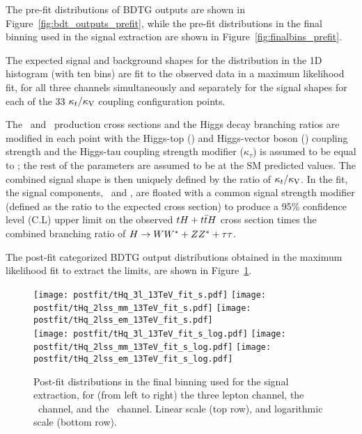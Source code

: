 The pre-fit distributions of BDTG outputs are shown in Figure~\ref{fig:bdt_outputs_prefit}, while the pre-fit distributions in the final binning used in the signal extraction are shown in Figure~\ref{fig:finalbins_prefit}.

The expected signal and background shapes for the distribution in the 1D histogram (with ten bins) are fit to the observed data in a maximum likelihood fit, for all three channels simultaneously and separately for the signal shapes for each of the 33 $\kappa_t/\kappa_\text{V}$ coupling configuration points.

The \tH\ and \ttH\ production cross sections and the Higgs decay branching ratios are modified in each point with the Higgs-top (\Ct) and Higgs-vector boson (\CV) coupling strength and the Higgs-tau coupling strength modifier ($\kappa_\tau$) is assumed to be equal to \Ct; %
the rest of the parameters are assumed to be at the SM predicted values. The combined signal shape is then uniquely defined by the ratio of $\kappa_t/\kappa_\text{V}$. In the fit, the signal components, \tH\ and \ttH, are floated with a common signal strength modifier (defined as the ratio to the expected cross section) to produce a 95\% confidence level (C.L) upper limit on the observed $tH+t\bar{t}H$ cross section times the combined branching ratio of $H\to WW^* + ZZ^* + \tau\tau$.

The post-fit categorized BDTG output distributions obtained in the maximum likelihood fit to extract the limits, are shown in Figure~\ref{fig:postfit}.

\begin{figure} [!h]
 \centering
 \texttt{[image: postfit/tHq\_3l\_13TeV\_fit\_s.pdf]}
 \texttt{[image: postfit/tHq\_2lss\_mm\_13TeV\_fit\_s.pdf]}
 \texttt{[image: postfit/tHq\_2lss\_em\_13TeV\_fit\_s.pdf]} \\
 \texttt{[image: postfit/tHq\_3l\_13TeV\_fit\_s\_log.pdf]}
 \texttt{[image: postfit/tHq\_2lss\_mm\_13TeV\_fit\_s\_log.pdf]}
 \texttt{[image: postfit/tHq\_2lss\_em\_13TeV\_fit\_s\_log.pdf]}
\caption[Post-fit distributions in the final binning.]{Post-fit distributions in the final binning used for the signal extraction, for (from left to right) the three lepton channel, the \mumu\ channel, and the \emu\ channel. Linear scale (top row), and logarithmic scale (bottom row).}
\label{fig:postfit}
\end{figure}

